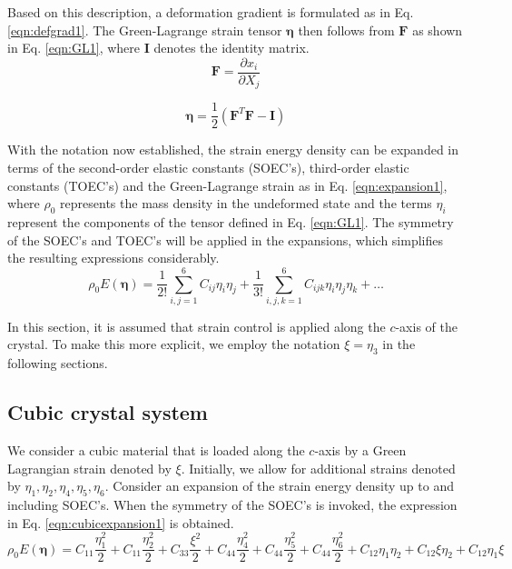 \documentclass[showpacs,aps,floatfix,prb,reprint,superscriptaddress,onecolumn]{revtex4-1}
\begin{document}
Based on this description, a deformation gradient is formulated as in Eq. \ref{eqn:defgrad1}. The Green-Lagrange strain tensor $\bm{\eta}$ then follows from $\bm{F}$ as shown in Eq. \ref{eqn:GL1}, where $\bm{I}$ denotes the identity matrix.
\begin{equation}
\label{eqn:defgrad1} 
\bm{F} = \frac{\partial x_{i}}{ \partial X_{j}}
\end{equation}

\begin{equation}
\label{eqn:GL1} 
\bm{\eta} = \frac{1}{2} \left(\bm{F}^{T} \bm{F} - \bm{I} \right)
\end{equation}

With the notation now established, the strain energy density can be expanded in terms of the second-order elastic constants (SOEC's), third-order elastic constants (TOEC's) and the Green-Lagrange strain  as in Eq. \ref{eqn:expansion1}, where $\rho_{0}$ represents the mass density in the undeformed state and the terms $\eta_{i}$ represent the components of the tensor defined in Eq. \ref{eqn:GL1}. The symmetry of the SOEC's and TOEC's will be applied in the expansions, which simplifies the resulting expressions considerably.
\begin{equation}
\label{eqn:expansion1} 
\rho_{0} E \left(\bm{\eta}\right) = \frac{1}{2!} \sum_{i,j=1}^{6} C_{ij} \eta_{i} \eta_{j} + \frac{1}{3!} \sum_{i,j,k=1}^{6} C_{ijk} \eta_{i} \eta_{j} \eta_{k} + \ldots
\end{equation}

In this section, it is assumed that strain control is applied along the $c$-axis of the crystal. To make this more explicit, we employ the notation $\xi = \eta_{3}$ in the following sections.

\subsection{Cubic crystal system}
We consider a cubic material that is loaded along the $c$-axis by a Green Lagrangian strain denoted by $\xi$. Initially, we allow for additional strains denoted by $\eta_1, \eta_2, \eta_4, \eta_5, \eta_6$. Consider an expansion of the strain energy density up to and including SOEC's. When the symmetry of the SOEC's is invoked, the expression in Eq. \ref{eqn:cubicexpansion1} is obtained.
\begin{equation}
\label{eqn:cubicexpansion1} 
\rho_{0} E \left(\bm{\eta}\right) = C_{11}\frac{\eta_{1}^2}{2} + C_{11}\frac{\eta_{2}^2}{2} +  C_{33}\frac{\xi^2}{2} + C_{44}\frac{\eta_{4}^2}{2} + C_{44}\frac{\eta_{5}^2}{2} + C_{44}\frac{\eta_{6}^2}{2} + C_{12}\eta_{1}\eta_{2} + C_{12}\xi\eta_{2} + C_{12}\eta_{1}\xi
\end{equation}
\end{document}
